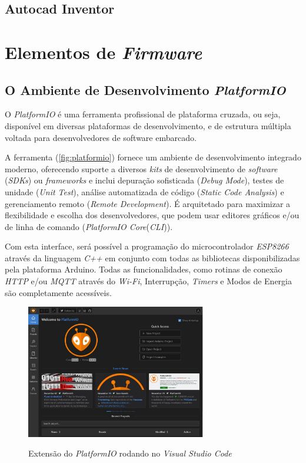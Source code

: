\subsection{Autocad Inventor}

\section{Elementos de \textit{Firmware}}

\subsection{O Ambiente de Desenvolvimento \textit{PlatformIO}}


O \textit{PlatformIO} é uma ferramenta profissional de plataforma cruzada, ou seja, disponível em diversas plataformas de desenvolvimento, e de estrutura múltipla voltada para desenvolvedores de software embarcado.

A ferramenta (\autoref{fig:platformio}) fornece um ambiente de desenvolvimento integrado moderno, oferecendo suporte a diversos \textit{kits} de desenvolvimento de \textit{software} (\textit{SDKs}) ou \textit{frameworks} e inclui depuração sofisticada (\textit{Debug Mode}), testes de unidade (\textit{Unit Test}), análise automatizada de código (\textit{Static Code Analysis}) e gerenciamento remoto (\textit{Remote Development}). É arquitetado para maximizar a flexibilidade e escolha dos desenvolvedores, que podem usar editores gráficos e/ou de linha de comando (\textit{PlatformIO Core}(\textit{CLI})).

Com esta interface, será possível a programação do microcontrolador \textit{ESP8266} através da linguagem \textit{C++} em conjunto com todas as bibliotecas disponibilizadas pela plataforma Arduino. Todas as funcionalidades, como rotinas de conexão \textit{HTTP} e/ou \textit{MQTT} através do \textit{Wi-Fi}, Interrupção, \textit{Timers} e Modos de Energia são completamente acessíveis. 

\begin{figure}[H]
	\centering
	\caption{Extensão do \textit{PlatformIO} rodando no \textit{Visual Studio Code}}
	\includegraphics[width=0.7\textwidth]{figuras/platformio.jpg}
	\label{fig:platformio}
	
\end{figure}


